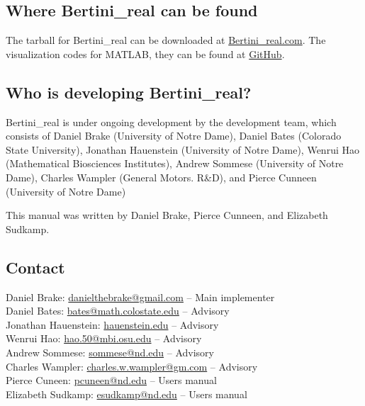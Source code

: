 \subsection{Where Bertini\_real can be found}
		
	The tarball for Bertini\_real can be downloaded at \href{http://www.bertinireal.com/download.html}{Bertini\_real.com}. 
	The visualization codes for MATLAB, they can be found at \href{https://github.com/ofloveandhate/bertini_real/tree/master/matlab_codes}{GitHub}.


	\subsection{Who is developing Bertini\_real?}
	Bertini\_real is under ongoing development by the development team, which consists of Daniel Brake (University of Notre Dame), Daniel Bates (Colorado State University), Jonathan Hauenstein (University of Notre Dame), Wenrui Hao (Mathematical Biosciences Institutes), Andrew Sommese (University of Notre Dame), Charles Wampler (General Motors. R\&D), and Pierce Cunneen (University of Notre Dame)\par
		This manual was written by Daniel Brake, Pierce Cunneen, and Elizabeth Sudkamp.


\subsection{Contact}
\label{sec:contact}

Daniel Brake: \href{mailto:danielthebrake@gmail.com}{danielthebrake@gmail.com} -- Main implementer\\
Daniel Bates: \href{mailto:bates@math.colostate.edu}{bates@math.colostate.edu} -- Advisory \\
Jonathan Hauenstein: \href{mailto:hauenstein.edu}{hauenstein.edu} -- Advisory\\
Wenrui Hao: \href{mailto:hao.50@mbi.osu.edu}{hao.50@mbi.osu.edu} -- Advisory\\
Andrew Sommese: \href{mailto:sommese@nd.edu}{sommese@nd.edu} -- Advisory\\
Charles Wampler: \href{mailto:charles.w.wampler@gm.com}{charles.w.wampler@gm.com} -- Advisory\\
Pierce Cuneen: \href{mailto:pcuneen@nd.edu}{pcuneen@nd.edu} -- Users manual \\
Elizabeth Sudkamp: \href{mailto:esudkamp@nd.edu}{esudkamp@nd.edu} -- Users manual

